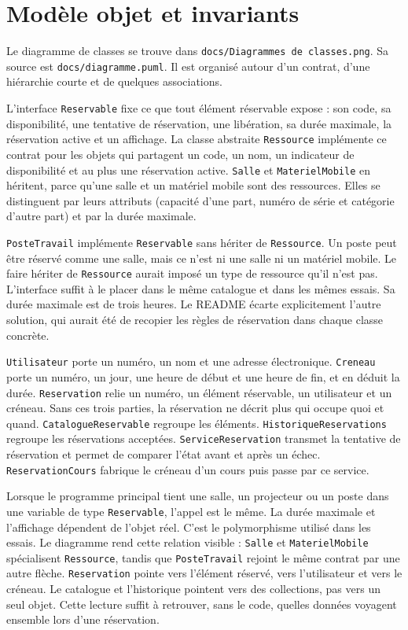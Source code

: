 \documentclass[11pt,a4paper]{article}
\begin{document}
\section{Modèle objet et invariants}

Le diagramme de classes se trouve dans \texttt{docs/Diagrammes de classes.png}. Sa source est \texttt{docs/diagramme.puml}. Il est organisé autour d'un contrat, d'une hiérarchie courte et de quelques associations.

L'interface \texttt{Reservable} fixe ce que tout élément réservable expose : son code, sa disponibilité, une tentative de réservation, une libération, sa durée maximale, la réservation active et un affichage. La classe abstraite \texttt{Ressource} implémente ce contrat pour les objets qui partagent un code, un nom, un indicateur de disponibilité et au plus une réservation active. \texttt{Salle} et \texttt{MaterielMobile} en héritent, parce qu'une salle et un matériel mobile sont des ressources. Elles se distinguent par leurs attributs (capacité d'une part, numéro de série et catégorie d'autre part) et par la durée maximale.

\texttt{PosteTravail} implémente \texttt{Reservable} sans hériter de \texttt{Ressource}. Un poste peut être réservé comme une salle, mais ce n'est ni une salle ni un matériel mobile. Le faire hériter de \texttt{Ressource} aurait imposé un type de ressource qu'il n'est pas. L'interface suffit à le placer dans le même catalogue et dans les mêmes essais. Sa durée maximale est de trois heures. Le README écarte explicitement l'autre solution, qui aurait été de recopier les règles de réservation dans chaque classe concrète.

\texttt{Utilisateur} porte un numéro, un nom et une adresse électronique. \texttt{Creneau} porte un numéro, un jour, une heure de début et une heure de fin, et en déduit la durée. \texttt{Reservation} relie un numéro, un élément réservable, un utilisateur et un créneau. Sans ces trois parties, la réservation ne décrit plus qui occupe quoi et quand. \texttt{CatalogueReservable} regroupe les éléments. \texttt{HistoriqueReservations} regroupe les réservations acceptées. \texttt{ServiceReservation} transmet la tentative de réservation et permet de comparer l'état avant et après un échec. \texttt{ReservationCours} fabrique le créneau d'un cours puis passe par ce service.

Lorsque le programme principal tient une salle, un projecteur ou un poste dans une variable de type \texttt{Reservable}, l'appel est le même. La durée maximale et l'affichage dépendent de l'objet réel. C'est le polymorphisme utilisé dans les essais. Le diagramme rend cette relation visible : \texttt{Salle} et \texttt{MaterielMobile} spécialisent \texttt{Ressource}, tandis que \texttt{PosteTravail} rejoint le même contrat par une autre flèche. \texttt{Reservation} pointe vers l'élément réservé, vers l'utilisateur et vers le créneau. Le catalogue et l'historique pointent vers des collections, pas vers un seul objet. Cette lecture suffit à retrouver, sans le code, quelles données voyagent ensemble lors d'une réservation.
\end{document}
